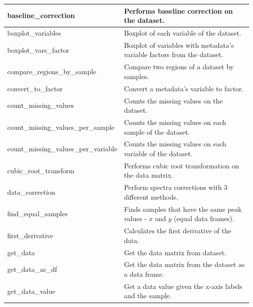 \begin{scriptsize}
\begin{longtable}{|m{4.3cm}|m{11cm}|}
		\hline
		baseline\_correction & Performs baseline correction on the dataset. \\
		
		\hline
		boxplot\_variables & Boxplot of each variable of the dataset. \\
		
		\hline
		boxplot\_vars\_factor & Boxplot of variables with metadata's variable factors from the dataset. \\
		
		\hline
		compare\_regions\_by\_sample & Compare two regions of a dataset by samples. \\
		
		\hline
		convert\_to\_factor & Convert a metadata's variable to factor. \\
		
		\hline
		count\_missing\_values & Counts the missing values on the dataset. \\
		
		\hline
		count\_missing\_values\_per\_sample & Counts the missing values on each sample of the dataset. \\
		
		\hline
		count\_missing\_values\_per\_variable & Counts the missing values on each variable of the dataset. \\
		
		\hline
		cubic\_root\_transform & Performs cubic root transformation on the data matrix. \\
		
		\hline
		data\_correction & Perform spectra corrections with 3 different methods. \\
		
		\hline
		find\_equal\_samples & Finds samples that have the same peak values - $ x $ and $ y $ (equal data frames). \\
		
		\hline
		first\_derivative & Calculates the first derivative of the data. \\
		
		\hline
		get\_data & Get the data matrix from dataset. \\
		
		\hline
		get\_data\_as\_df & Get the data matrix from the dataset as a data frame. \\
		
		\hline
		get\_data\_value & Get a data value given the x-axis labels and the sample. \\
		

\end{longtable}
\end{scriptsize}
